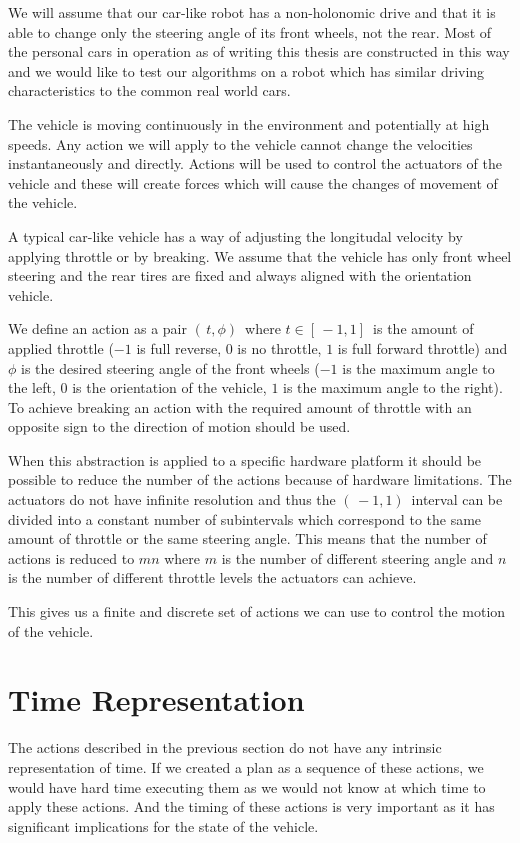 We will assume that our car-like robot has a non-holonomic drive and that it is able to change only the steering angle of its front wheels, not the rear. Most of the personal cars in operation as of writing this thesis are constructed in this way and we would like to test our algorithms on a robot which has similar driving characteristics to the common real world cars.

The vehicle is moving continuously in the environment and potentially at high speeds. Any action we will apply to the vehicle cannot change the velocities instantaneously and directly. Actions will be used to control the actuators of the vehicle and these will create forces which will cause the changes of movement of the vehicle.

A typical car-like vehicle has a way of adjusting the longitudal velocity by applying throttle or by breaking. We assume that the vehicle has only front wheel steering and the rear tires are fixed and always aligned with the orientation vehicle.

We define an action as a pair $( \, t, \phi ) \,$ where $t \in [ \, -1, 1 ] \,$ is the amount of applied throttle ($-1$ is full reverse, $0$ is no throttle, $1$ is full forward throttle) and $\phi$ is the desired steering angle of the front wheels ($-1$ is the maximum angle to the left, $0$ is the orientation of the vehicle, $1$ is the maximum angle to the right). To achieve breaking an action with the required amount of throttle with an opposite sign to the direction of motion should be used.

When this abstraction is applied to a specific hardware platform it should be possible to reduce the number of the actions because of hardware limitations. The actuators do not have infinite resolution and thus the $( \, -1, 1 ) \,$ interval can be divided into a constant number of subintervals which correspond to the same amount of throttle or the same steering angle. This means that the number of actions is reduced to $mn$ where $m$ is the number of different steering angle and $n$ is the number of different throttle levels the actuators can achieve.

This gives us a finite and discrete set of actions we can use to control the motion of the vehicle.

\section{Time Representation}

The actions described in the previous section do not have any intrinsic representation of time. If we created a plan as a sequence of these actions, we would have hard time executing them as we would not know at which time to apply these actions. And the timing of these actions is very important as it has significant implications for the state of the vehicle.

